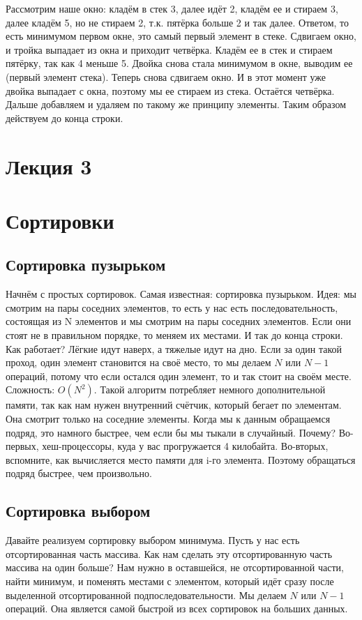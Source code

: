 \documentclass[12pt]{article}
\begin{document}
Рассмотрим наше окно: кладём в стек 3, далее идёт 2, кладём ее и стираем 3, далее кладём 5, но не стираем 2, т.к. пятёрка больше 2 и так далее. Ответом, то есть минимумом первом окне, это самый первый элемент в стеке. Сдвигаем окно, и тройка выпадает из окна и приходит четвёрка. Кладём ее в стек и стираем пятёрку, так как 4 меньше 5. Двойка снова стала минимумом в окне, выводим ее (первый элемент стека). Теперь снова сдвигаем окно. И в этот момент уже двойка выпадает с окна, поэтому мы ее стираем из стека. Остаётся четвёрка. Дальше добавляем и удаляем по такому же принципу элементы. Таким образом действуем до конца строки.
\newpage
\section*{Лекция 3}
\section*{Сортировки}
\subsection*{Сортировка пузырьком}
Начнём с простых сортировок. Самая известная: сортировка пузырьком. Идея: мы смотрим на пары соседних элементов, то есть у нас есть последовательность, состоящая из N элементов и мы смотрим на пары соседних элементов. Если они стоят не в правильном порядке, то меняем их местами. И так до конца строки. Как работает? Лёгкие идут наверх, а тяжелые идут на дно. Если за один такой проход, один элемент становится на своё место, то мы делаем $N$ или $N - 1$ операций, потому что если остался один элемент, то и так стоит на своём месте. Сложность: $O(N^2)$. Такой алгоритм потребляет немного дополнительной памяти, так как нам нужен внутренний счётчик, который бегает по элементам. Она смотрит только на соседние элементы. Когда мы к данным обращаемся подряд, это намного быстрее, чем если бы мы тыкали в случайный. Почему? Во-первых, хеш-процессоры, куда у вас прогружается 4 килобайта. Во-вторых, вспомните, как вычисляется место памяти для i-го элемента. Поэтому обращаться подряд быстрее, чем произвольно.
\subsection*{Сортировка выбором}
Давайте реализуем сортировку выбором минимума. Пусть у нас есть отсортированная часть массива. Как нам сделать эту отсортированную часть массива на один больше? Нам нужно в оставшейся, не отсортированной части, найти минимум, и поменять местами с элементом, который идёт сразу после выделенной отсортированной подпоследовательности. Мы делаем $N$ или $N - 1$ операций. Она является самой быстрой из всех сортировок на больших данных.
\end{document}
